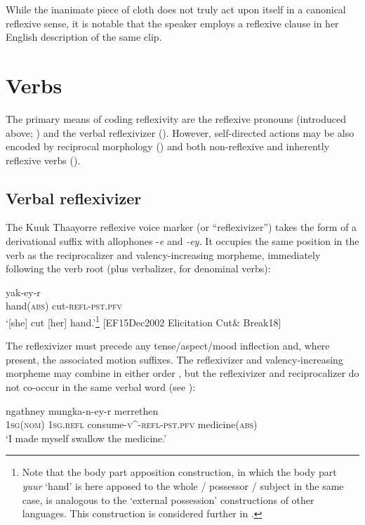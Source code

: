 \documentclass[output=paper]{langscibook}
\begin{document}
While the inanimate piece of cloth does not truly act upon itself in a canonical reflexive sense, it is notable that the speaker employs a reflexive clause in her English description of the same clip.

\section{Verbs}\label{sec:Gaby:3}
The primary means of coding reflexivity are the reflexive pronouns (introduced above; ) and the verbal reflexivizer (). However, self-directed actions may be also encoded by reciprocal morphology () and both non-reflexive and inherently reflexive verbs (). 

\subsection{Verbal reflexivizer}
\label{sec:Gaby:3.1}
The Kuuk Thaayorre reflexive voice marker (or “reflexivizer”) takes the form of a derivational suffix with allophones -\textit{e} and \textit{{}-ey.} It occupies the same position in the verb as the reciprocalizer and valency-increasing morpheme, immediately following the verb root (plus verbalizer, for denominal verbs):


\ea 
    \label{ex:Gaby:5}
      {yak-ey-r} \\
    hand(\textsc{abs})  cut-\textsc{refl-pst.pfv}\\
    \glt ‘[she] cut [her] hand.’\footnote{Note that the body part apposition construction, in which the body part \textit{yuur} ‘hand’ is here apposed to the whole / possessor / subject in the same case, is analogous to the ‘external possession’ constructions of other languages. This construction is considered further in .} [EF15Dec2002 Elicitation Cut\& Break18]
    \z


The reflexivizer must precede any tense/aspect/mood inflection and, where present, the associated motion suffixes. The reflexivizer and valency-increasing morpheme may combine in either order , but the reflexivizer and reciprocalizer do not co-occur in the same verbal word (see \citealt[292 ff.]{GabyExperts2017}):

\ea 
    \label{ex:Gaby:6}
      {ngathney} {mungka-n-ey-r}  {merrethen} \\
     \textsc{1sg}(\textsc{nom})  \textsc{1sg}.\textsc{refl}  consume-\textsc{v}\^{}-\textsc{refl}{}-\textsc{pst.pfv}  medicine(\textsc{abs})\\
    \glt  ‘I made myself swallow the medicine.’ \citep[392]{Hall1972}
    \z
\end{document}
